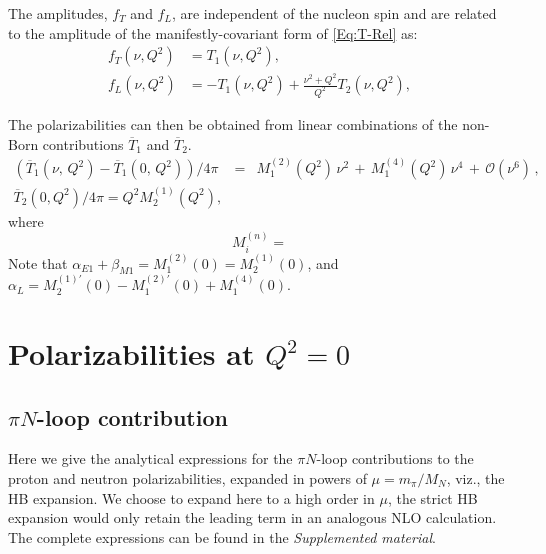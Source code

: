 \documentclass[12pt,preprint,tightenlines,
showpacs,preprintnumbers,amsmath,amssymb,
a4paper,nofootinbib]{revtex4-1}
\def\beq{\begin{equation}}
\def\eeq{\end{equation}}
\def\bea{\begin{eqnarray}}
\def\eea{\end{eqnarray}}
\def\al{\alpha}
\def\be{\beta}
\def\ol#1{\overline{#1}}
\begin{document}
The amplitudes, $f_T$ and $f_L$, are independent of the nucleon spin and are
related to the amplitude of the  manifestly-covariant form of \eqref{Eq:T-Rel} as:
\begin{subequations}
\begin{align}
  f_T(\nu,Q^2) &= T_1(\nu,Q^2), \label{Eq:fT-T1}\\
  f_L(\nu,Q^2) &= - T_1(\nu,Q^2) +  \frac{\nu^2 + Q^2}{Q^2} T_2(\nu,Q^2), \label{Eq:fL-T1T2}
\end{align} 
\end{subequations}





The polarizabilities can then be obtained from linear combinations of the non-Born contributions  $\ol T_1$ and $\ol T_2$. 
\bea
\left(\ol T_1(\nu,\,Q^2)-\ol T_1(0,\,Q^2)\right)/4\pi 
&=&
M^{(2)}_{1}(Q^2)  \, \nu^2 \,+\, M^{(4)}_{1}(Q^2)  \, \nu^4 \,+\,{\mathcal{O}}(\nu^6) \,,
\label{eq:T1lex}\\
\ol T_2(0,Q^2)/4\pi =  Q^2 M_2^{(1)}(Q^2) ,
\label{eq:T20}
\eea
where
\beq 
M_i^{(n)}  = 
\eeq 
Note that $\al_{E1}+\be_{M1} = M^{(2)}_{1}(0)=M^{(1)}_{2}(0)$, and 
$\alpha_L = M^{(1)\prime}_2(0)  - M^{(2)\prime}_1(0) 
+ M^{(4)}_1(0)$.




\section{Polarizabilities at $Q^2=0$}\label{App:PolarizabilitiesAll}


\subsection{$\pi N$-loop  contribution}
\label{App:Polarizabilities}

Here we give the analytical expressions for the $\pi N$-loop contributions to the proton and neutron polarizabilities, expanded
in powers of $\mu = m_\pi/M_N$, viz., the HB expansion. We
choose to expand here to a high order in $\mu$, the strict
HB expansion would only retain the leading term in an analogous
NLO calculation. The complete expressions can be found in the {\it Supplemented material}.
\end{document}
